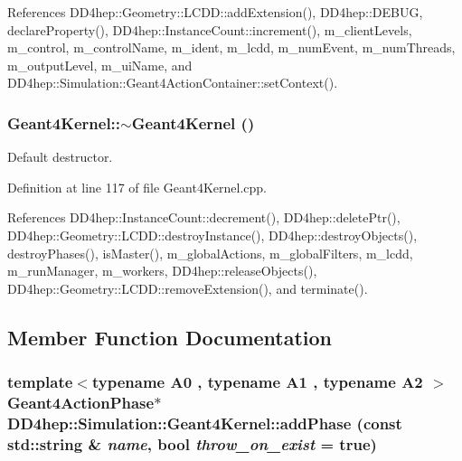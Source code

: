 References DD4hep::Geometry::LCDD::addExtension(), DD4hep::DEBUG, declareProperty(), DD4hep::InstanceCount::increment(), m\_\-clientLevels, m\_\-control, m\_\-controlName, m\_\-ident, m\_\-lcdd, m\_\-numEvent, m\_\-numThreads, m\_\-outputLevel, m\_\-uiName, and DD4hep::Simulation::Geant4ActionContainer::setContext().\hypertarget{class_d_d4hep_1_1_simulation_1_1_geant4_kernel_a57dadf34909a60f7771fa15d4b7501d4}{
\subsubsection[{$\sim$Geant4Kernel}]{\setlength{\rightskip}{0pt plus 5cm}Geant4Kernel::$\sim$Geant4Kernel ()}}
\label{class_d_d4hep_1_1_simulation_1_1_geant4_kernel_a57dadf34909a60f7771fa15d4b7501d4}


Default destructor. 

Definition at line 117 of file Geant4Kernel.cpp.

References DD4hep::InstanceCount::decrement(), DD4hep::deletePtr(), DD4hep::Geometry::LCDD::destroyInstance(), DD4hep::destroyObjects(), destroyPhases(), isMaster(), m\_\-globalActions, m\_\-globalFilters, m\_\-lcdd, m\_\-runManager, m\_\-workers, DD4hep::releaseObjects(), DD4hep::Geometry::LCDD::removeExtension(), and terminate().

\subsection{Member Function Documentation}
\hypertarget{class_d_d4hep_1_1_simulation_1_1_geant4_kernel_a3f0e8487909e620f5d7a74153c4aa418}{
\subsubsection[{addPhase}]{\setlength{\rightskip}{0pt plus 5cm}template$<$typename A0 , typename A1 , typename A2 $>$ {\bf Geant4ActionPhase}$\ast$ DD4hep::Simulation::Geant4Kernel::addPhase (const std::string \& {\em name}, \/  bool {\em throw\_\-on\_\-exist} = {\ttfamily true})}}
\label{class_d_d4hep_1_1_simulation_1_1_geant4_kernel_a3f0e8487909e620f5d7a74153c4aa418}



